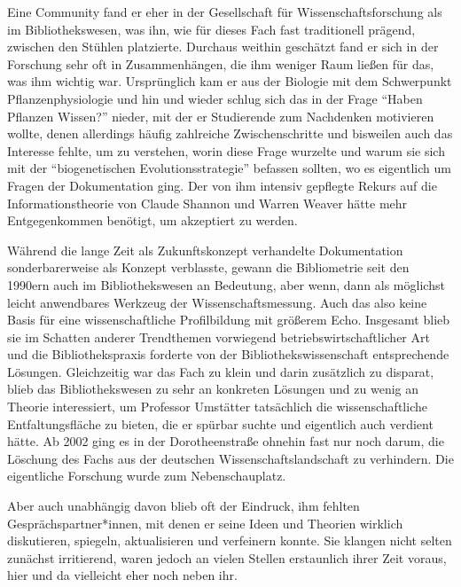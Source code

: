 \documentclass[a4paper,
fontsize=11pt,
oneside,
numbers=noperiodatend,
parskip=half-,
bibliography=totoc,
final
]{scrartcl}
\begin{document}
Eine Community fand er eher in der Gesellschaft für
Wissenschaftsforschung als im Bibliothekswesen, was ihn, wie für dieses
Fach fast traditionell prägend, zwischen den Stühlen platzierte.
Durchaus weithin geschätzt fand er sich in der Forschung sehr oft in
Zusammenhängen, die ihm weniger Raum ließen für das, was ihm wichtig
war. Ursprünglich kam er aus der Biologie mit dem Schwerpunkt
Pflanzenphysiologie und hin und wieder schlug sich das in der Frage
\enquote{Haben Pflanzen Wissen?} nieder, mit der er Studierende zum
Nachdenken motivieren wollte, denen allerdings häufig zahlreiche
Zwischenschritte und bisweilen auch das Interesse fehlte, um zu
verstehen, worin diese Frage wurzelte und warum sie sich mit der
\enquote{biogenetischen Evolutionsstrategie} befassen sollten, wo es
eigentlich um Fragen der Dokumentation ging. Der von ihm intensiv
gepflegte Rekurs auf die Informationstheorie von Claude Shannon und
Warren Weaver hätte mehr Entgegenkommen benötigt, um akzeptiert zu
werden.

Während die lange Zeit als Zukunftskonzept verhandelte Dokumentation
sonderbarerweise als Konzept verblasste, gewann die Bibliometrie seit
den 1990ern auch im Bibliothekswesen an Bedeutung, aber wenn, dann als
möglichst leicht anwendbares Werkzeug der Wissenschaftsmessung. Auch das
also keine Basis für eine wissenschaftliche Profilbildung mit größerem
Echo. Insgesamt blieb sie im Schatten anderer Trendthemen vorwiegend
betriebswirtschaftlicher Art und die Bibliothekspraxis forderte von der
Bibliothekswissenschaft entsprechende Lösungen. Gleichzeitig war das
Fach zu klein und darin zusätzlich zu disparat, blieb das
Bibliothekswesen zu sehr an konkreten Lösungen und zu wenig an Theorie
interessiert, um Professor Umstätter tatsächlich die wissenschaftliche
Entfaltungsfläche zu bieten, die er spürbar suchte und eigentlich auch
verdient hätte. Ab 2002 ging es in der Dorotheenstraße ohnehin fast nur
noch darum, die Löschung des Fachs aus der deutschen
Wissenschaftslandschaft zu verhindern. Die eigentliche Forschung wurde
zum Nebenschauplatz.

Aber auch unabhängig davon blieb oft der Eindruck, ihm fehlten
Gesprächspartner*innen, mit denen er seine Ideen und Theorien wirklich
diskutieren, spiegeln, aktualisieren und verfeinern konnte. Sie klangen
nicht selten zunächst irritierend, waren jedoch an vielen Stellen
erstaunlich ihrer Zeit voraus, hier und da vielleicht eher noch neben
ihr.
\end{document}
